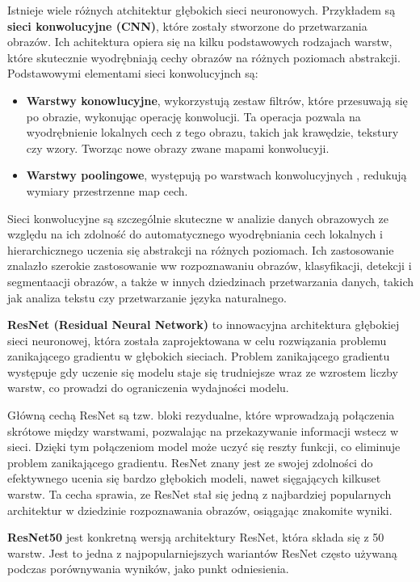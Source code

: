 Istnieje wiele różnych atchitektur głębokich sieci neuronowych.
Przykładem są \textbf{sieci konwolucyjne (CNN)}\cite{8379889}, które zostały stworzone do przetwarzania obrazów.
Ich achitektura opiera się na kilku podstawowych rodzajach warstw, które skutecznie wyodrębniają cechy obrazów na różnych poziomach abstrakcji.
Podstawowymi elementami sieci konwolucyjnch są:
\begin{itemize}
	\item \textbf{Warstwy konowlucyjne}, wykorzystują zestaw filtrów, które przesuwają się po obrazie, wykonując operację konwolucji.
	      Ta operacja pozwala na wyodrębnienie lokalnych cech z tego obrazu, takich jak krawędzie, tekstury czy wzory.
	      Tworząc nowe obrazy zwane mapami konwolucyji.
	\item \textbf{Warstwy poolingowe}, występują po warstwach konwolucyjnych , redukują wymiary przestrzenne map cech.
\end{itemize}
Sieci konwolucyjne są szczególnie skuteczne w analizie danych obrazowych ze względu na ich zdolność do automatycznego wyodrębniania cech lokalnych i hierarchicznego uczenia się abstrakcji na różnych poziomach.
Ich zastosowanie znalazło szerokie zastosowanie ww rozpoznawaniu obrazów, klasyfikacji, detekcji i segmentaacji obrazów, a także w innych dziedzinach przetwarzania danych, takich jak analiza tekstu czy przetwarzanie języka naturalnego.

\textbf{ResNet (Residual Neural Network)}\cite{He_2016_CVPR} to innowacyjna architektura głębokiej sieci neuronowej, która została zaprojektowana w celu rozwiązania problemu zanikającego gradientu w głębokich sieciach.
Problem zanikającego gradientu występuje gdy uczenie się modelu staje się trudniejsze wraz ze wzrostem liczby warstw, co prowadzi do ograniczenia wydajności modelu.

Główną cechą ResNet są tzw. bloki rezydualne, które wprowadzają połączenia skrótowe między warstwami, pozwalając na przekazywanie informacji wstecz w sieci.
Dzięki tym połączeniom model może uczyć się reszty funkcji, co eliminuje problem zanikającego gradientu.
ResNet znany jest ze swojej zdolności do efektywnego ucenia się bardzo głębokich modeli, nawet sięgających kilkuset warstw.
Ta cecha sprawia, ze ResNet stał się jedną z najbardziej popularnych architektur w dziedzinie rozpoznawania obrazów, osiągając znakomite wyniki.

\textbf{ResNet50}\cite{Koonce2021} jest konkretną wersją architektury ResNet, która składa się z 50 warstw.
Jest to jedna z najpopularniejszych wariantów ResNet często używaną podczas porównywania wyników, jako punkt odniesienia.

